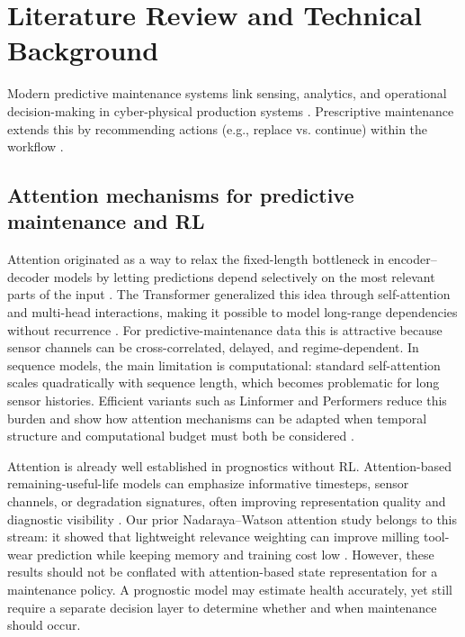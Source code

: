 \documentclass[sn-basic]{sn-jnl}%
\begin{document}
\section{Literature Review and Technical Background}
\label{sec:lit_tech}

Modern predictive maintenance systems link sensing, analytics, and operational decision-making in cyber-physical production systems \cite{Compare2020, Zonta2020}. Prescriptive maintenance extends this by recommending actions (e.g., replace vs. continue) within the workflow \cite{Ansari2019}. 

\subsection{Attention mechanisms for predictive maintenance and RL}
Attention originated as a way to relax the fixed-length bottleneck in encoder--decoder models by letting predictions depend selectively on the most relevant parts of the input \cite{Bahdanau2014, Luong2015}. The Transformer generalized this idea through self-attention and multi-head interactions, making it possible to model long-range dependencies without recurrence \cite{Vaswani2017}. For predictive-maintenance data this is attractive because sensor channels can be cross-correlated, delayed, and regime-dependent. In sequence models, the main limitation is computational: standard self-attention scales quadratically with sequence length, which becomes problematic for long sensor histories. Efficient variants such as Linformer and Performers reduce this burden and show how attention mechanisms can be adapted when temporal structure and computational budget must both be considered \cite{Wang2020Linformer, Choromanski2020}.

Attention is already well established in prognostics without RL. Attention-based remaining-useful-life models can emphasize informative timesteps, sensor channels, or degradation signatures, often improving representation quality and diagnostic visibility \cite{Chen2020, Chen2021, Costa2023}. Our prior Nadaraya--Watson attention study belongs to this stream: it showed that lightweight relevance weighting can improve milling tool-wear prediction while keeping memory and training cost low \cite{Siraskar2024}. However, these results should not be conflated with attention-based state representation for a maintenance policy. A prognostic model may estimate health accurately, yet still require a separate decision layer to determine whether and when maintenance should occur.
\end{document}
